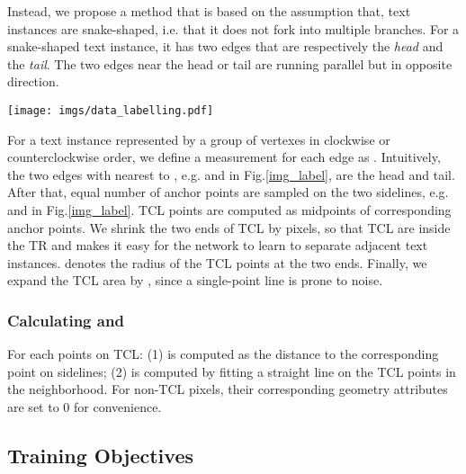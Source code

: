 \documentclass[runningheads]{llncs}
\begin{document}
Instead, we propose a method that is based on the assumption that, text instances are snake-shaped, i.e. that it does not fork into multiple branches. For a snake-shaped text instance, it has two edges that are respectively the \textit{head} and the \textit{tail}. The two edges near the head or tail are running parallel but in opposite direction.

\begin{figure*}
\begin{centering}
\texttt{[image: imgs/data\_labelling.pdf]}
\par\end{centering}
\vspace{-4mm}
\caption{Label Generation. (a) Determining text head and tail; (b) Extracting text center line and calculating geometries; (c) Expanded text center line.} \label{img_label}
\vspace{-5mm}
\end{figure*}

For a text instance  represented by a group of  vertexes  in clockwise or counterclockwise order, we define a  measurement for each edge  as . Intuitively, the two edges with  nearest to , e.g.  and  in Fig.\ref{img_label}, are the head and tail. After that, equal number of anchor points are sampled on the two sidelines, e.g.  and  in Fig.\ref{img_label}. TCL points are computed as midpoints of corresponding anchor points. We shrink the two ends of TCL by  pixels, so that TCL are inside the TR and makes it easy for the network to learn to separate adjacent text instances.  denotes the radius of the TCL points at the two ends. Finally, we expand the TCL area by , since a single-point line is prone to noise.









\subsubsection{Calculating  and }
For each points on TCL: (1)  is computed as the distance to the corresponding point on sidelines; (2)  is computed by fitting a straight line on the TCL points in the neighborhood. For non-TCL pixels, their corresponding geometry attributes are set to 0 for convenience. 

\subsection{Training Objectives}
\end{document}
